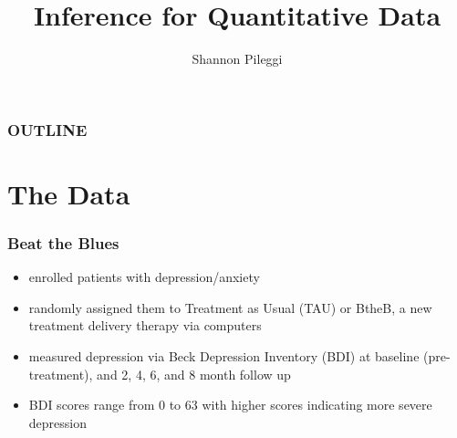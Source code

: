 





\title[Unit 3 Deck 1]{Inference for Quantitative Data}
\author[Pileggi]{Shannon Pileggi}


\date{}




\begin{frame}
\titlepage
\end{frame}

\begin{frame}
\frametitle{OUTLINE\qquad\qquad\qquad} \tableofcontents[hideallsubsections]
\end{frame}


\section[The Data]{The Data}
\begin{frame}
\frametitle{Beat the Blues}
\begin{itemize}
    \item
    enrolled patients with depression/anxiety
    \item
    randomly assigned them to Treatment as Usual (TAU) or BtheB, a new treatment delivery therapy via computers
    \item
    measured depression via Beck Depression Inventory (BDI) at baseline (pre-treatment), and 2, 4, 6, and 8 month follow up
    \item
    BDI scores range from 0 to 63 with higher scores indicating more severe depression
\end{itemize}
\end{frame}

